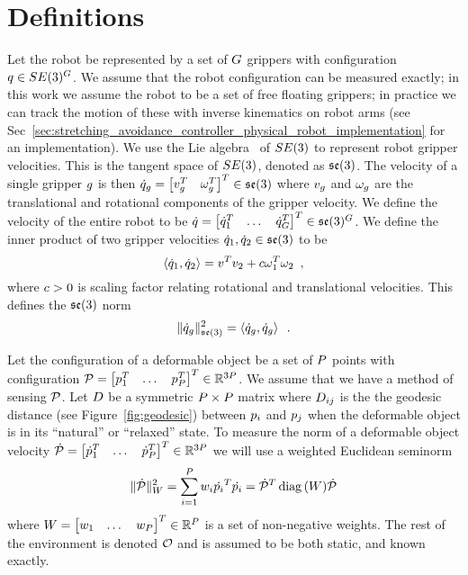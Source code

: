 
\section{Definitions}

Let the robot be represented by a set of $G$ grippers with configuration $q \in SE(3)^G$.  We assume that the robot configuration can be measured exactly; in this work we assume the robot to be a set of free floating grippers; in practice we can track the motion of these with inverse kinematics on robot arms (see Sec~\ref{sec:stretching_avoidance_controller_physical_robot_implementation} for an implementation). We use the Lie algebra~\cite{Murray1994} of $SE(3)$ to represent robot gripper velocities. This is the tangent space of $SE(3)$, denoted as $\mathfrak{se}(3)$. The velocity of a single gripper $g$ is then $\dot{q}_g = \begin{bmatrix}v_g^T & \omega_g^T\end{bmatrix}^T \in \mathfrak{se}(3)$ where $v_g$ and $\omega_g$ are the translational and rotational components of the gripper velocity. We define the velocity of the entire robot to be $\dot{q} = \begin{bmatrix}\dot{q}_1^T & \dots & \dot{q}_G^T \end{bmatrix}^T \in \mathfrak{se}(3)^G$. We define the inner product of two gripper velocities $\dot{q}_1, \dot{q}_2 \in \mathfrak{se}(3)$ to be 
\begin{equation}
    \left \langle \dot{q}_1, \dot{q}_2 \right \rangle = v^T v_2 + c \omega_1^T \omega_2 \enspace,
\end{equation}
where $c > 0$ is scaling factor relating rotational and translational velocities. This defines the $\mathfrak{se}(3)$ norm
\begin{equation}
    \| \dot{q}_g \|_{\mathfrak{se}(3)}^2 = \left \langle \dot{q}_g, \dot{q}_g \right \rangle \enspace .
\end{equation}

Let the configuration of a deformable object be a set of $P$ points with configuration $\mathcal{P} = \begin{bmatrix} p_1^T & \dots & p_P^T \end{bmatrix}^T \in \mathbb{R}^{3P}$. We assume that we have a method of sensing $\mathcal{P}$. Let $D$ be a symmetric $P \times P$ matrix where $D_{i j}$ is the the geodesic distance (see Figure~\ref{fig:geodesic}) between $p_i$ and $p_j$ when the deformable object is in its ``natural'' or ``relaxed'' state. To measure the norm of a deformable object velocity $\dot{\mathcal{P}} = \begin{bmatrix} \dot{p}_1^T & \dots & \dot{p}_P^T \end{bmatrix}^T \in \mathbb{R}^{3P}$ we will use a weighted Euclidean seminorm
\begin{equation}
    \| \dot{\mathcal{P}} \|^2_W = \sum_{i = 1}^P w_i \dot{p_i}^T \dot{p_i} = \dot{\mathcal{P}}^T \operatorname*{diag}{(W)} \dot{\mathcal{P}}
\end{equation}
where $W = \begin{bmatrix}w_1 & \dots & w_P \end{bmatrix}^T \in \mathbb{R}^P$ is a set of non-negative weights. The rest of the environment is denoted $\mathcal{O}$ and is assumed to be both static, and known exactly.

